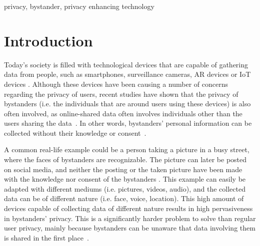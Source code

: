 \documentclass[conference, 11pt]{IEEEtran}
\begin{document}
\begin{IEEEkeywords}
privacy, bystander, privacy enhancing technology
\end{IEEEkeywords}

\section{Introduction}\label{Intro}
Today's society is filled with technological devices that are capable of gathering data from people, such as smartphones, surveillance cameras, \ac{AR} devices or \ac{IoT} devices \cite{lu2017privacy, shu2016cardea, denning2014situ}. Although these devices have been causing a number of concerns regarding the privacy of users, recent studies have shown that the privacy of bystanders (i.e. the individuals that are around users using these devices) is also often involved, as online-shared data often involves individuals other than the users sharing the data~\cite{olteanu2018consensual}. In other words, bystanders' personal information can be collected without their knowledge or consent~\cite{lu2017privacy}.

A common real-life example could be a person taking a picture in a busy street, where the faces of bystanders are recognizable. The picture can later be posted on social media, and neither the posting or the taken picture have been made with the knowledge nor consent of the bystanders \cite{shu2016cardea}. This example can easily be adapted with different mediums (i.e. pictures, videos, audio), and the collected data can be of different nature (i.e. face, voice, location). This high amount of devices capable of collecting data of different nature results in high pervasiveness in bystanders' privacy. This is a significantly harder problem to solve than regular user privacy, mainly because bystanders can be unaware that data involving them is shared in the first place~\cite{olteanu2018consensual}.
\end{document}
